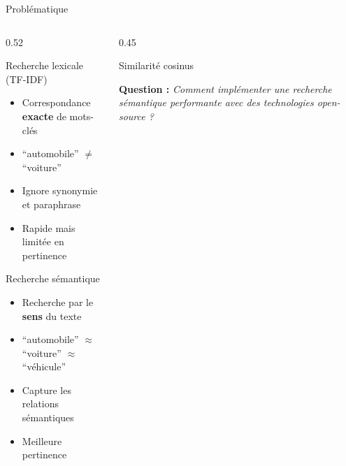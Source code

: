 \documentclass[aspectratio=169, 10pt]{beamer}
\begin{document}
\begin{frame}{Probl\'{e}matique}
  \begin{columns}[T]
    \begin{column}{0.52\textwidth}
      \begin{block}{Recherche lexicale (TF-IDF)}
        \begin{itemize}
          \item Correspondance \textbf{exacte} de mots-cl\'{e}s
          \item ``automobile'' $\neq$ ``voiture''
          \item Ignore synonymie et paraphrase
          \item Rapide mais limit\'{e}e en pertinence
        \end{itemize}
      \end{block}
      \vspace{0.5em}
      \begin{block}{Recherche s\'{e}mantique}
        \begin{itemize}
          \item Recherche par le \textbf{sens} du texte
          \item ``automobile'' $\approx$ ``voiture'' $\approx$ ``v\'{e}hicule''
          \item Capture les relations s\'{e}mantiques
          \item Meilleure pertinence
        \end{itemize}
      \end{block}
    \end{column}
    \begin{column}{0.45\textwidth}
      \begin{block}{Similarit\'{e} cosinus}
        \centering
      \end{block}
      \vspace{0.3em}
      \textbf{\textcolor{ASTRAorange}{Question :}}
      \textit{\small Comment impl\'{e}menter une recherche s\'{e}mantique performante avec des technologies open-source ?}
    \end{column}
  \end{columns}
\end{frame}
\end{document}
